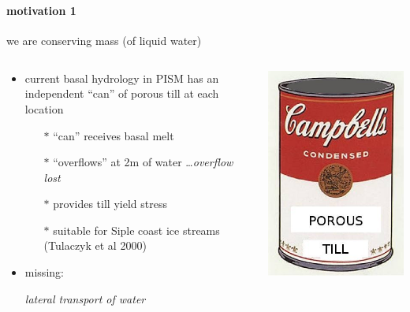 \documentclass[hide notes,intlimits]{beamer}
\begin{document}
\begin{frame}
  \frametitle{\whytitle}
  \framesubtitle{motivation 1}

\vspace{-6mm}
\begin{center}
  we are  conserving mass (of liquid water)
\end{center}

\vspace{-5mm}
\begin{columns}
\begin{column}{0.5\textwidth}
  \begin{itemize}
    \item current basal hydrology in PISM has an independent ``can'' of porous till at each location
      \begin{itemize}
        \item[$\ast$] ``can'' receives basal melt
        \item[$\ast$] ``overflows'' at 2m of water \dots \emph{overflow lost}
        \item[$\ast$] provides till yield stress
        \item[$\ast$] suitable for Siple coast ice streams (Tulaczyk et al 2000)      \end{itemize}
    \item missing:
    
      \begin{center} \emph{lateral transport of water} \end{center}
  \end{itemize}
\end{column}
\begin{column}{0.5\textwidth}
\begin{center}
\includegraphics[height=0.3\textheight]{figs/till-warhol-soup}


\end{center}
\end{column}
\end{columns}
\end{frame}
\end{document}
